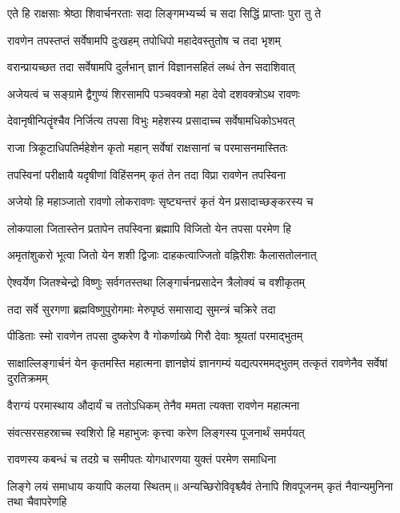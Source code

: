 \twolineshloka
{एते हि राक्षसाः श्रेष्ठा शिवार्चनरताः सदा}
{लिङ्गमभ्यर्च्य च सदा सिद्धिं प्राप्ताः पुरा तु ते}%

\twolineshloka
{रावणेन तपस्तप्तं सर्वेषामपि दुःखहम्}
{तपोधिपो महादेवस्तुतोष च तदा भृशम्}%

\twolineshloka
{वरान्प्रायच्छत तदा सर्वेषामपि दुर्लभान्}
{ज्ञानं विज्ञानसहितं लब्धं तेन सदाशिवात्}%

\twolineshloka
{अजेयत्वं च सङ्ग्रामे द्वैगुण्यं शिरसामपि}
{पञ्चवक्त्रो महा देवो दशवक्त्रोऽथ रावणः}%

\twolineshloka
{देवानृषीन्पितॄंश्चैव निर्जित्य तपसा विभुः}
{महेशस्य प्रसादाच्च सर्वेषामधिकोऽभवत्}%

\twolineshloka
{राजा त्रिकूटाधिपतिर्महेशेन कृतो महान्}
{सर्वेषां राक्षसानां च परमासनमास्तितः}%

\twolineshloka
{तपस्विनां परीक्षायै यदृषीणां विहिंसनम्}
{कृतं तेन तदा विप्रा रावणेन तपस्विना}%

\twolineshloka
{अजेयो हि महाञ्जातो रावणो लोकरावणः}
{सृष्ट्यन्तरं कृतं येन प्रसादाच्छङ्करस्य च}%

\twolineshloka
{लोकपाला जितास्तेन प्रतापेन तपस्विना}
{ब्रह्मापि विजितो येन तपसा परमेण हि}%

\twolineshloka
{अमृतांशुकरो भूत्वा जितो येन शशी द्विजाः}
{दाहकत्वाज्जितो वह्निरीशः कैलासतोलनात्}%

\twolineshloka
{ऐश्वर्येण जितश्चेन्द्रो विष्णुः सर्वगतस्तथा}
{लिङ्गार्चनप्रसादेन त्रैलोक्यं च वशीकृतम्}%

\twolineshloka
{तदा सर्वे सुरगणा ब्रह्मविष्णुपुरोगमाः}
{मेरुपृष्ठं समासाद्य सुमन्त्रं चक्रिरे तदा}%

\twolineshloka
{पीडिताः स्मो रावणेन तपसा दुष्करेण वै}
{गोकर्णाख्ये गिरौ देवाः श्रूयतां परमाद्भुतम्}%

\threelineshloka
{साक्षाल्लिङ्गार्चनं येन कृतमस्ति महात्मना}
{ज्ञानज्ञेयं ज्ञानगम्यं यद्यत्परममद्भुतम्}
{तत्कृतं रावणेनैव सर्वेषां दुरतिक्रमम्}%

\twolineshloka
{वैराग्यं परमास्थाय औदार्यं च ततोऽधिकम्}
{तेनैव ममता त्यक्ता रावणेन महात्मना}%

\twolineshloka
{संवत्सरसहस्राच्च स्वशिरो हि महाभुजः}
{कृत्त्वा करेण लिङ्गस्य पूजनार्थं समर्पयत्}%

\twolineshloka
{रावणस्य कबन्धं च तदग्रे च समीपतः}
{योगधारणया युक्तं परमेण समाधिना}%

\threelineshloka
{लिङ्गे लयं समाधाय कयापि कलया स्थितम्॥}
{अन्यच्छिरोविवृश्च्यैवं तेनापि शिवपूजनम्}
{कृतं नैवान्यमुनिना तथा चैवापरेणहि}%

